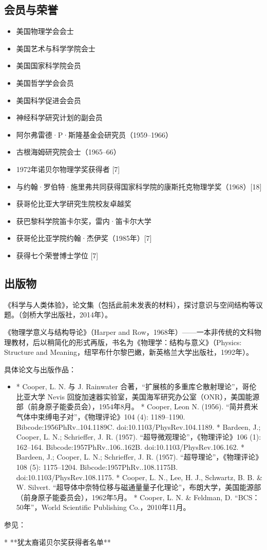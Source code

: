 \subsection{会员与荣誉}
\begin{itemize}
\item 美国物理学会会士 
\item 美国艺术与科学学院会士 
\item 美国国家科学院会员
\item 美国哲学学会会员 
\item 美国科学促进会会员 
\item 神经科学研究计划的副会员 
\item 阿尔弗雷德·P·斯隆基金会研究员（1959–1966）
\item 古根海姆研究院会士（1965–66）
\item 1972年诺贝尔物理学奖获得者 [7]
\item 与约翰·罗伯特·施里弗共同获得国家科学院的康斯托克物理学奖（1968）[18]
\item 获哥伦比亚大学研究生院校友卓越奖 
\item 获巴黎科学院笛卡尔奖，雷内·笛卡尔大学
\item 获哥伦比亚学院约翰·杰伊奖（1985年）[7]
\item 获得七个荣誉博士学位 [7]
\end{itemize}
\subsection{出版物}
《科学与人类体验》，论文集（包括此前未发表的材料），探讨意识与空间结构等议题。（剑桥大学出版社，2014年）。

《物理学意义与结构导论》（Harper and Row，1968年）——一本非传统的文科物理教材，后以稍简化的形式再版，书名为《物理学：结构与意义》（Physics: Structure and Meaning，纽罕布什尔黎巴嫩，新英格兰大学出版社，1992年）。

具体论文与出版作品：

\begin{itemize}
\item * Cooper, L. N. 与 J. Rainwater 合著，“扩展核的多重库仑散射理论”，哥伦比亚大学 Nevis 回旋加速器实验室，美国海军研究办公室（ONR），美国能源部（前身原子能委员会），1954年8月。
* Cooper, Leon N. (1956). “简并费米气体中束缚电子对”，《物理评论》104 (4): 1189–1190. Bibcode:1956PhRv..104.1189C. doi:10.1103/PhysRev.104.1189.
* Bardeen, J.; Cooper, L. N.; Schrieffer, J. R. (1957). “超导微观理论”，《物理评论》106 (1): 162–164. Bibcode:1957PhRv..106..162B. doi:10.1103/PhysRev.106.162.
* Bardeen, J.; Cooper, L. N.; Schrieffer, J. R. (1957). “超导理论”，《物理评论》108 (5): 1175–1204. Bibcode:1957PhRv..108.1175B. doi:10.1103/PhysRev.108.1175.
* Cooper, L. N., Lee, H. J., Schwartz, B. B. & W. Silvert. “超导体中奈特位移与磁通量量子化理论”，布朗大学，美国能源部（前身原子能委员会），1962年5月。
* Cooper, L. N. & Feldman, D. “BCS：50年”，World Scientific Publishing Co.，2010年11月。
\end{itemize}

参见：

* **犹太裔诺贝尔奖获得者名单**
